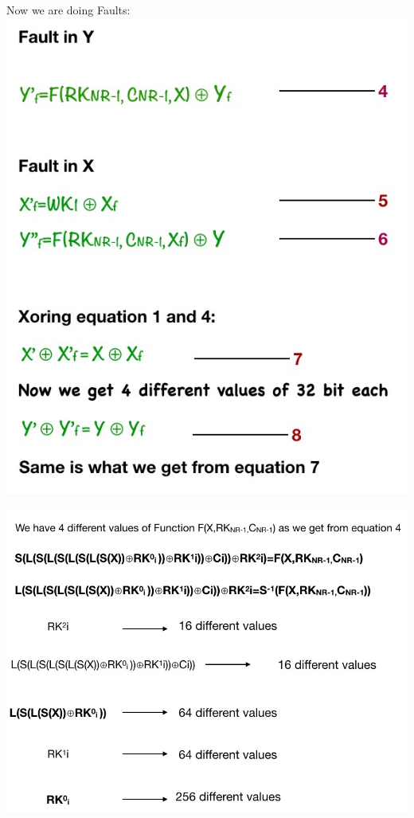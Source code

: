 Now we are doing Faults:\\

\includegraphics[scale=0.7]{project/images/9.jpg}

\includegraphics[scale=0.60]{project/images/10.jpg}



